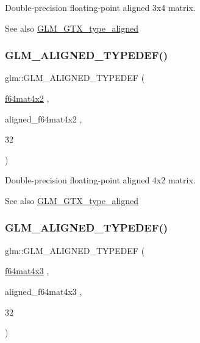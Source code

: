 Double-\/precision floating-\/point aligned 3x4 matrix. \begin{DoxySeeAlso}{See also}
\mbox{\hyperlink{group__gtx__type__aligned}{G\+L\+M\+\_\+\+G\+T\+X\+\_\+type\+\_\+aligned}} 
\end{DoxySeeAlso}
\mbox{\label{group__gtx__type__aligned_ga41e82cd6ac07f912ba2a2d45799dcf0d}} 
\subsubsection{\texorpdfstring{GLM\_ALIGNED\_TYPEDEF()}{GLM\_ALIGNED\_TYPEDEF()}\hspace{0.1cm}{\footnotesize\ttfamily [202/209]}}
{\footnotesize\ttfamily glm\+::\+G\+L\+M\+\_\+\+A\+L\+I\+G\+N\+E\+D\+\_\+\+T\+Y\+P\+E\+D\+EF (\begin{DoxyParamCaption}\item[{\mbox{\hyperlink{group__gtc__type__precision_ga13dbaf75e4f1b18c35d2837067a14ce9}{f64mat4x2}}}]{,  }\item[{aligned\+\_\+f64mat4x2}]{,  }\item[{32}]{ }\end{DoxyParamCaption})}

Double-\/precision floating-\/point aligned 4x2 matrix. \begin{DoxySeeAlso}{See also}
\mbox{\hyperlink{group__gtx__type__aligned}{G\+L\+M\+\_\+\+G\+T\+X\+\_\+type\+\_\+aligned}} 
\end{DoxySeeAlso}
\mbox{\label{group__gtx__type__aligned_ga0892638d6ba773043b3d63d1d092622e}} 
\subsubsection{\texorpdfstring{GLM\_ALIGNED\_TYPEDEF()}{GLM\_ALIGNED\_TYPEDEF()}\hspace{0.1cm}{\footnotesize\ttfamily [203/209]}}
{\footnotesize\ttfamily glm\+::\+G\+L\+M\+\_\+\+A\+L\+I\+G\+N\+E\+D\+\_\+\+T\+Y\+P\+E\+D\+EF (\begin{DoxyParamCaption}\item[{\mbox{\hyperlink{group__gtc__type__precision_gab10a195a85f65da47bf70438f57a8a3c}{f64mat4x3}}}]{,  }\item[{aligned\+\_\+f64mat4x3}]{,  }\item[{32}]{ }\end{DoxyParamCaption})}

